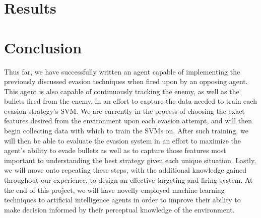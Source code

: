 \documentclass{article}
\theoremstyle{plain}
\theoremstyle{definition}
\theoremstyle{remark}
\begin{document}
%
%
%
%
%
%

\section{Results}


\section{Conclusion}

Thus far, we have successfully written an agent capable of implementing the previously discussed evasion techniques when fired upon by an opposing agent. This agent is also capable of continuously tracking the enemy, as well as the bullets fired from the enemy, in an effort to capture the data needed to train each evasion strategy's SVM. We are currently in the process of choosing the exact features desired from the environment upon each evasion attempt, and will then begin collecting data with which to train the SVMs on. After such training, we will then be able to evaluate the evasion system in an effort to maximize the agent's ability to evade bullets as well as to capture those features most important to understanding the best strategy given each unique situation. Lastly, we will move onto repeating these steps, with the additional knowledge gained throughout our experience, to design an effective targeting and firing system. At the end of this project, we will have novelly employed machine learning techniques to artificial intelligence agents in order to improve their ability to make decision informed by their perceptual knowledge of the environment.



\end{document}
